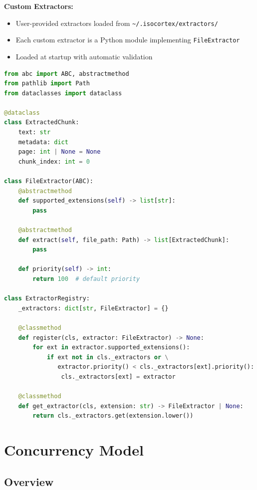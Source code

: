 \documentclass[11pt,a4paper]{article}
\newcommand{\inlinecode}[1]{\texttt{\small\colorbox{ctCodeBg}{#1}}}
\begin{document}
\begin{reqbox}
\textbf{Custom Extractors:}
\begin{itemize}
    \item User-provided extractors loaded from \inlinecode{\textasciitilde/.isocortex/extractors/}
    \item Each custom extractor is a Python module implementing \inlinecode{FileExtractor}
    \item Loaded at startup with automatic validation
\end{itemize}
\end{reqbox}

\begin{lstlisting}[language=Python,title={FileExtractor ABC and Registry}]
from abc import ABC, abstractmethod
from pathlib import Path
from dataclasses import dataclass

@dataclass
class ExtractedChunk:
    text: str
    metadata: dict
    page: int | None = None
    chunk_index: int = 0

class FileExtractor(ABC):
    @abstractmethod
    def supported_extensions(self) -> list[str]:
        pass

    @abstractmethod
    def extract(self, file_path: Path) -> list[ExtractedChunk]:
        pass

    def priority(self) -> int:
        return 100  # default priority

class ExtractorRegistry:
    _extractors: dict[str, FileExtractor] = {}

    @classmethod
    def register(cls, extractor: FileExtractor) -> None:
        for ext in extractor.supported_extensions():
            if ext not in cls._extractors or \
               extractor.priority() < cls._extractors[ext].priority():
                cls._extractors[ext] = extractor

    @classmethod
    def get_extractor(cls, extension: str) -> FileExtractor | None:
        return cls._extractors.get(extension.lower())
\end{lstlisting}

\section{Concurrency Model}

\subsection{Overview}
\end{document}
